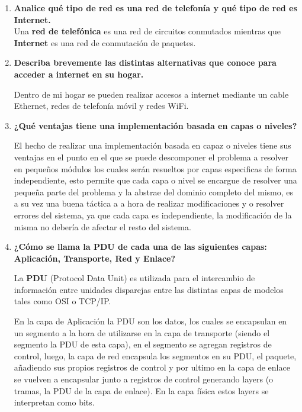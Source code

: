 \documentclass[a4paper,10pt]{article}
\begin{document}
\begin{enumerate}
	\item \textbf{Analice qué tipo de red es una red de telefonía y qué tipo de red es Internet.} \\
	
	Una \textbf{red de telefónica} es una red de circuitos conmutados mientras que \textbf{Internet} es una red de conmutación de paquetes.
	
	\item \textbf{Describa brevemente las distintas alternativas que conoce para acceder a internet en su hogar.}
	
	Dentro de mi hogar se pueden realizar accesos a internet mediante un cable Ethernet, redes de telefonía móvil y redes WiFi. \\
	
	\item \textbf{¿Qué ventajas tiene una implementación basada en capas o niveles?}
	
	El hecho de realizar una implementación basada en capaz o niveles tiene sus ventajas en el punto en el que se puede descomponer el problema a resolver en pequeños módulos los cuales serán resueltos por capas especificas de forma independiente, esto permite que cada capa o nivel se encargue de resolver una pequeña parte del problema y la abstrae del dominio completo del mismo, es a su vez una buena táctica a a hora de realizar modificaciones y o resolver errores del sistema, ya que cada capa es independiente, la modificación de la misma no debería de afectar el resto del sistema. \\
	
	\item \textbf{¿Cómo se llama la PDU de cada una de las siguientes capas: Aplicación, Transporte, Red y Enlace?}
	
	La \textbf{PDU} (Protocol Data Unit) es utilizada para el intercambio de información entre unidades disparejas entre las distintas capas de modelos tales como OSI o TCP/IP.

	En la capa de Aplicación la PDU son los datos, los cuales se encapsulan en un segmento a la hora de utilizarse en la capa de transporte (siendo el segmento la PDU de esta capa), en el segmento se agregan registros de control, luego, la capa de red encapsula los segmentos en su PDU, el paquete, añadiendo sus propios registros de control y por ultimo en la capa de enlace se vuelven a encapsular junto a registros de control generando layers (o tramas, la PDU de la capa de enlace). En la capa física estos layers se interpretan como bits. \\
	

\end{enumerate}
\end{document}
